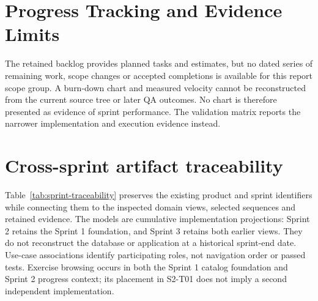 \documentclass[12pt,a4paper,openany]{report}
\begin{document}
\endgroup

\section{Progress Tracking and Evidence Limits}

The retained backlog provides planned tasks and estimates, but no dated series of remaining work, scope changes or accepted completions is available for this report scope group. A burn-down chart and measured velocity cannot be reconstructed from the current source tree or later QA outcomes. No chart is therefore presented as evidence of sprint performance. The validation matrix reports the narrower implementation and execution evidence instead.


\section{Cross-sprint artifact traceability}

Table~\ref{tab:sprint-traceability} preserves the existing product and sprint identifiers while connecting them to the inspected domain views, selected sequences and retained evidence. The models are cumulative implementation projections: Sprint 2 retains the Sprint 1 foundation, and Sprint 3 retains both earlier views. They do not reconstruct the database or application at a historical sprint-end date. Use-case associations identify participating roles, not navigation order or passed tests. Exercise browsing occurs in both the Sprint 1 catalog foundation and Sprint 2 progress context; its placement in S2-T01 does not imply a second independent implementation.
\end{document}
